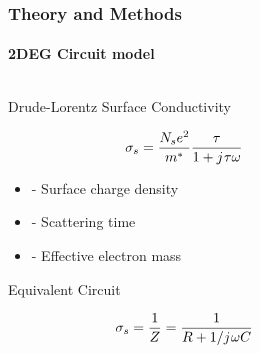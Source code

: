 \documentclass[mathserif,16pt,xcolor=table]{beamer}
\begin{document}
      \begin{frame}
        \frametitle{Theory and Methods}
        \framesubtitle{2DEG Circuit model}
        \begin{columns} %
          \begin{column}{.5\textwidth}
            \begin{minipage}[T][.1\textheight][c]{\linewidth}
              \begin{outline}[itemize]
                \1 Drude-Lorentz Surface Conductivity
              \end{outline}
              \begin{equation} \nonumber
                \sigma_s = \frac{N_s e^2}{m^{\ast}}\frac{\tau}{1 + {j}\mkern1mu \tau \omega}
                \label{eq:Y2deg}
              \end{equation}
              \begin{itemize}
                \item[] { - Surface charge density}
                \item[] {\makebox[.3cm][l]{$\tau$} - Scattering time}
                \item[] { - Effective electron mass}
              \end{itemize}
              \begin{outline}[itemize]
                \1 Equivalent Circuit
                \end{outline}
                \begin{equation} \nonumber
                  \sigma_s = \frac{1}{Z} = \frac{1}{R + {1}/{{j}\mkern1mu \omega C}}
                  \label{eq:simga_TL}
                \end{equation}
            \end{minipage}
          \end{column}
          \begin{column}{.5\textwidth}

\end{column}
\end{columns}
\end{frame}
\end{document}
